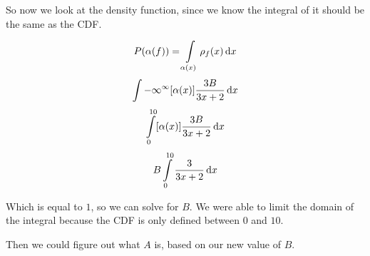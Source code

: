 \documentclass{article}
\renewcommand{\d}[1]{\,\textnormal{d}#1}
\begin{document}
So now we look at the density function, since we know the integral of
it should be the same as the CDF.

\[
P(\alpha(f)) = \int\limits_{\alpha(x)}\rho_f(x)\d{x}
\] \[
\int\limits{-\infty}^{\infty}\lbrack\alpha(x)\rbrack\frac{3B}{3x+2}\d{x}
\] \[
\int\limits_{0}^{10}\lbrack \alpha(x)\rbrack\frac{3B}{3x+2}\d{x}
\] \[
B\int\limits_{0}^{10}\frac{3}{3x+2}\d{x}
\]

Which is equal to $1$, so we can solve for $B$. We were able to limit
the domain of the integral because the CDF is only defined between $0$
and $10$.

Then we could figure out what $A$ is, based on our new value of $B$.
\end{document}

